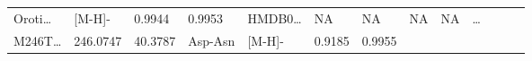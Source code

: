 \documentclass[
]{article}
\begin{document}
\begin{longtable}[]{@{}lllllllllllll@{}}
\begin{minipage}[t]{0.05\columnwidth}
Oroti\ldots{}\strut
\end{minipage} & \begin{minipage}[t]{0.05\columnwidth}\raggedright
{[}M-H{]}-\strut
\end{minipage} & \begin{minipage}[t]{0.07\columnwidth}\raggedright
0.9944\strut
\end{minipage} & \begin{minipage}[t]{0.07\columnwidth}\raggedright
0.9953\strut
\end{minipage} & \begin{minipage}[t]{0.05\columnwidth}\raggedright
HMDB0\ldots{}\strut
\end{minipage} & \begin{minipage}[t]{0.04\columnwidth}\raggedright
NA\strut
\end{minipage} & \begin{minipage}[t]{0.05\columnwidth}\raggedright
NA\strut
\end{minipage} & \begin{minipage}[t]{0.05\columnwidth}\raggedright
NA\strut
\end{minipage} & \begin{minipage}[t]{0.05\columnwidth}\raggedright
NA\strut
\end{minipage} & \begin{minipage}[t]{0.02\columnwidth}\raggedright
\ldots{}\strut
\end{minipage}\tabularnewline
\begin{minipage}[t]{0.05\columnwidth}\raggedright
M246T\ldots{}\strut
\end{minipage} & \begin{minipage}[t]{0.05\columnwidth}\raggedright
246.0747\strut
\end{minipage} & \begin{minipage}[t]{0.05\columnwidth}\raggedright
40.3787\strut
\end{minipage} & \begin{minipage}[t]{0.05\columnwidth}\raggedright
Asp-Asn\strut
\end{minipage} & \begin{minipage}[t]{0.05\columnwidth}\raggedright
{[}M-H{]}-\strut
\end{minipage} & \begin{minipage}[t]{0.07\columnwidth}\raggedright
0.9185\strut
\end{minipage} & \begin{minipage}[t]{0.07\columnwidth}\raggedright
0.9955\strut

\end{minipage}
\end{longtable}
\end{document}
